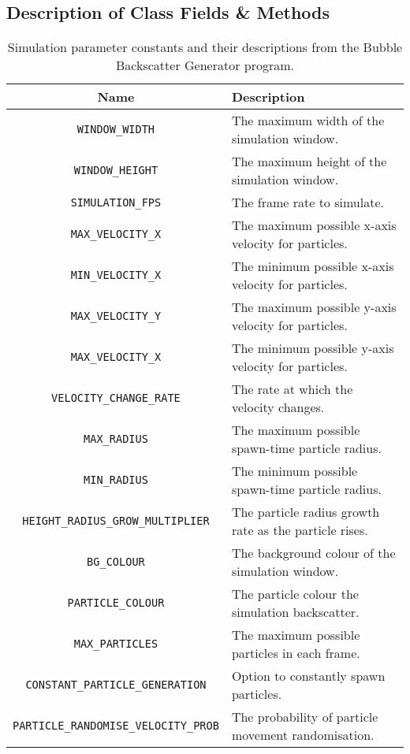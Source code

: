 \subsection{Description of Class Fields \& Methods}
\label{sim_tbls}
\begin{table}[H]
    \centering
    \begin{tabularx}{\linewidth}{c | X}
        Name    &   Description\\
        \hline
        \hline
        \texttt{WINDOW\_WIDTH}          &   The maximum width of the simulation window.\\
        \hline
        \texttt{WINDOW\_HEIGHT}         & The maximum height of the simulation window.\\
        \hline
        \texttt{SIMULATION\_FPS}        & The frame rate to simulate.\\
        \hline
        \texttt{MAX\_VELOCITY\_X}       & The maximum possible x-axis velocity for particles.\\
        \hline
        \texttt{MIN\_VELOCITY\_X}   & The minimum possible x-axis velocity for particles.\\
        \hline
        \texttt{MAX\_VELOCITY\_Y}   & The maximum possible y-axis velocity for particles.\\
        \hline
        \texttt{MAX\_VELOCITY\_X}       & The minimum possible y-axis velocity for particles.\\
        \hline
        \texttt{VELOCITY\_CHANGE\_RATE}     & The rate at which the velocity changes.\\
        \hline
        \texttt{MAX\_RADIUS}    & The maximum possible spawn-time particle radius.\\
        \hline
        \texttt{MIN\_RADIUS}    & The minimum possible spawn-time particle radius.\\
        \hline
        \texttt{HEIGHT\_RADIUS\_GROW\_MULTIPLIER}   & The particle radius growth rate as the particle rises.\\
        \hline
        \texttt{BG\_COLOUR}  & The background colour of the simulation window.\\
        \hline
        \texttt{PARTICLE\_COLOUR}  & The particle colour the simulation backscatter.\\
        \hline
        \texttt{MAX\_PARTICLES}  & The maximum possible particles in each frame.\\
        \hline
        \texttt{CONSTANT\_PARTICLE\_GENERATION}  & Option to constantly spawn particles.\\
        \hline
        \texttt{PARTICLE\_RANDOMISE\_VELOCITY\_PROB}  & The probability of particle movement randomisation.\\
        \hline
    \end{tabularx}
    \caption{Simulation parameter constants and their descriptions from the Bubble Backscatter Generator program.}
    \label{table:simbubbleclassparams}
\end{table}

